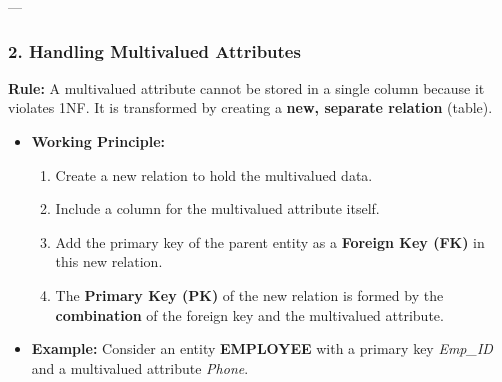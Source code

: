 \documentclass[12pt,a3paper]{article}
\begin{document}
\begin{enumerate}
\begin{tcolorbox}[enhanced,breakable,ansbox,colback=cA!4,colframe=cA,boxrule=0.8pt,arc=5pt,title={\textbf{Answer}},fonttitle=\bfseries\color{white},colbacktitle=cA]
\begin{center}
\end{center}

---

\subsubsection*{2. Handling Multivalued Attributes}

\textbf{Rule:} A multivalued attribute cannot be stored in a single column because it violates 1NF. It is transformed by creating a \textbf{new, separate relation} (table). 

\begin{itemize}
    \item \textbf{Working Principle:} 
    \begin{enumerate}
        \item Create a new relation to hold the multivalued data.
        \item Include a column for the multivalued attribute itself.
        \item Add the primary key of the parent entity as a \textbf{Foreign Key (FK)} in this new relation.
        \item The \textbf{Primary Key (PK)} of the new relation is formed by the \textbf{combination} of the foreign key and the multivalued attribute.
    \end{enumerate}
    \item \textbf{Example:} Consider an entity \textbf{EMPLOYEE} with a primary key \textit{Emp\_ID} and a multivalued attribute \textit{Phone}.
\end{itemize}


\end{tcolorbox}
\end{enumerate}
\end{document}
